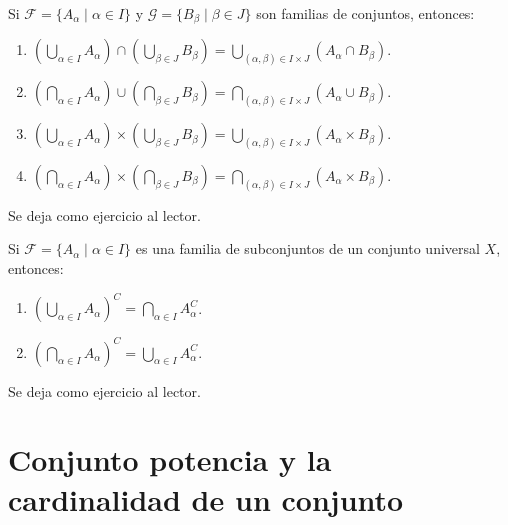\begin{theorem}{}{}
    Si $\mathcal{F} = \{A_\alpha \mid \alpha \in I\}$ y $\mathcal{G} = \{B_\beta \mid \beta \in J\}$ son familias de conjuntos, entonces:
    \begin{enumerate}[label=\roman*., topsep=6pt, itemsep=0pt]
        \item $\displaystyle \left(\bigcup_{\alpha \in I} A_\alpha\right) \cap \left(\bigcup_{\beta \in J} B_\beta\right)=\bigcup_{(\alpha,  \beta) \in I \times J} \left(A_\alpha \cap B_\beta\right)$.
        \item $\displaystyle \left(\bigcap_{\alpha \in I} A_\alpha\right) \cup \left(\bigcap_{\beta \in J} B_\beta\right)=\bigcap_{(\alpha,  \beta) \in I \times J}\left(A_\alpha \cup B_\beta\right)$.
        \item $\displaystyle \left(\bigcup_{\alpha \in I} A_\alpha\right) \times \left(\bigcup_{\beta \in J} B_\beta\right)=\bigcup_{(\alpha,  \beta) \in I \times J} \left(A_\alpha \times B_\beta\right)$.
        \item $\displaystyle \left(\bigcap_{\alpha \in I} A_\alpha\right) \times \left(\bigcap_{\beta \in J} B_\beta\right)=\bigcap_{(\alpha,  \beta) \in I \times J}\left(A_\alpha \times B_\beta\right)$.
    \end{enumerate}
    \tcblower
    \demostracion Se deja como ejercicio al lector.
\end{theorem}

\newpage

\begin{theorem}{}{}
    Si $\mathcal{F} = \{A_\alpha \mid \alpha \in I\}$ es una familia de subconjuntos de un conjunto universal $X$, entonces:
    \begin{enumerate}[label=\roman*., topsep=6pt, itemsep=0pt]
        \item $\displaystyle \left(\bigcup_{\alpha \in I} A_\alpha\right)^C = \bigcap_{\alpha \in I} A_\alpha^C$.
        \item $\displaystyle \left(\bigcap_{\alpha \in I} A_\alpha\right)^C = \bigcup_{\alpha \in I} A_\alpha^C$.
    \end{enumerate}
    \tcblower
    \demostracion Se deja como ejercicio al lector.
\end{theorem}

\section{Conjunto potencia y la cardinalidad de un conjunto}

